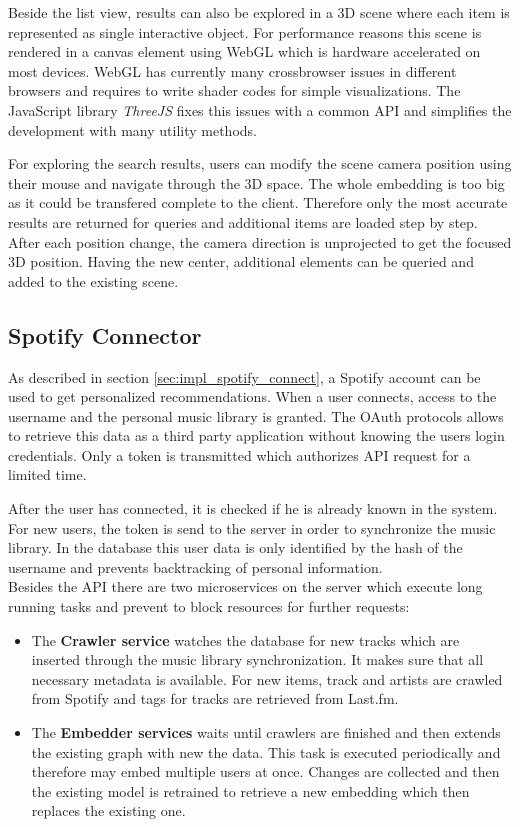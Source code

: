 \documentclass[sigconf]{acmart}
\begin{document}
Beside the list view, results can also be explored in a 3D scene where each item is represented as single interactive object. For performance reasons this scene is rendered in a canvas element using WebGL which is hardware accelerated on most devices. WebGL has currently many crossbrowser issues in different browsers and requires to write shader codes for simple visualizations. The JavaScript library \emph{ThreeJS} fixes this issues with a common API and simplifies the development with many utility methods.

For exploring the search results, users can modify the scene camera position using their mouse and navigate through the 3D space. The whole embedding is too big as it could be transfered complete to the client. Therefore only the most accurate results are returned for queries and additional items are loaded step by step. After each position change, the camera direction is unprojected to get the focused 3D position. Having the new center, additional elements can be queried and added to the existing scene.

\subsection{Spotify Connector}
As described in section \ref{sec:impl_spotify_connect}, a Spotify account can be used to get personalized recommendations. When a user connects, access to the username and the personal music library is granted. The OAuth protocols allows to retrieve this data as a third party application without knowing the users login credentials. Only a token is transmitted which authorizes API request for a limited time.

After the user has connected, it is checked if he is already known in the system. For new users, the token is send to the server in order to synchronize the music library. In the database this user data is only identified by the hash of the username and prevents backtracking of personal information.\\

Besides the API there are two microservices on the server which execute long running tasks and prevent to block resources for further requests:
\begin{itemize}
	\item The \textbf{Crawler service} watches the database for new tracks which are inserted through the music library synchronization. It makes sure that all necessary metadata is available. For new items, track and artists are crawled from Spotify and tags for tracks are retrieved from Last.fm.
	\item The \textbf{Embedder services} waits until crawlers are finished and then extends the existing graph with new the data. This task is executed periodically and therefore may embed multiple users at once. Changes are collected and then the existing model is retrained to retrieve a new embedding which then replaces the existing one.
\end{itemize}
\end{document}
